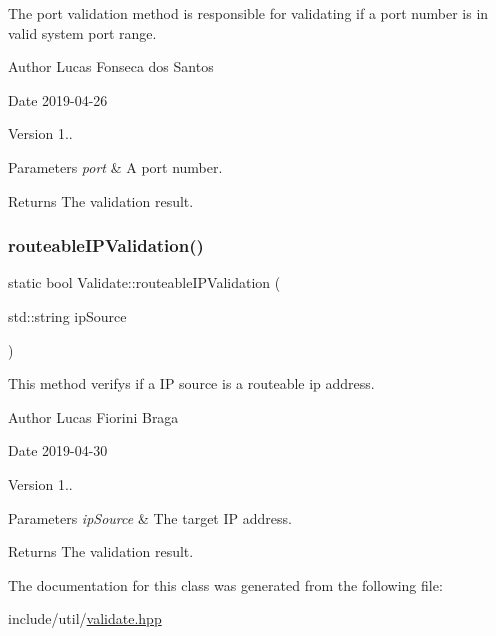 The port validation method is responsible for validating if a port number is in valid system port range. \begin{DoxyAuthor}{Author}
Lucas Fonseca dos Santos 
\end{DoxyAuthor}
\begin{DoxyDate}{Date}
2019-\/04-\/26 
\end{DoxyDate}
\begin{DoxyVersion}{Version}
1..
\end{DoxyVersion}

\begin{DoxyParams}{Parameters}
{\em port} & A port number. \\
\hline
\end{DoxyParams}
\begin{DoxyReturn}{Returns}
The validation result. 
\end{DoxyReturn}
\mbox{\label{classValidate_a7de09d185c262d596b9879727a4f298a}} 
\subsubsection{\texorpdfstring{routeable\+I\+P\+Validation()}{routeableIPValidation()}}
{\footnotesize\ttfamily static bool Validate\+::routeable\+I\+P\+Validation (\begin{DoxyParamCaption}\item[{std\+::string}]{ip\+Source }\end{DoxyParamCaption})\hspace{0.3cm}{\ttfamily [static]}}

This method verifys if a IP source is a routeable ip address. \begin{DoxyAuthor}{Author}
Lucas Fiorini Braga 
\end{DoxyAuthor}
\begin{DoxyDate}{Date}
2019-\/04-\/30 
\end{DoxyDate}
\begin{DoxyVersion}{Version}
1..
\end{DoxyVersion}

\begin{DoxyParams}{Parameters}
{\em ip\+Source} & The target IP address. \\
\hline
\end{DoxyParams}
\begin{DoxyReturn}{Returns}
The validation result. 
\end{DoxyReturn}


The documentation for this class was generated from the following file\+:\begin{DoxyCompactItemize}
\item 
include/util/\mbox{\hyperlink{validate_8hpp}{validate.\+hpp}}\end{DoxyCompactItemize}
